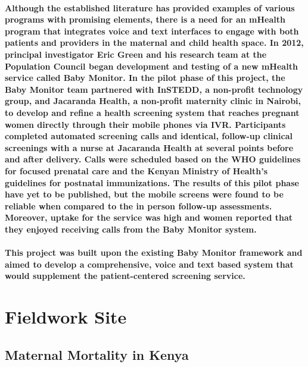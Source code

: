 

\paragraph{Although the established literature has provided examples of various programs with promising elements, there is a need for an mHealth program that integrates voice and text interfaces to engage with both patients and providers in the maternal and child health space. In 2012, principal investigator Eric Green and his research team at the Population Council began development and testing of a new mHealth service called Baby Monitor. In the pilot phase of this project, the Baby Monitor team partnered with InSTEDD, a non-profit technology group, and Jacaranda Health, a non-profit maternity clinic in Nairobi, to develop and refine a health screening system that reaches pregnant women directly through their mobile phones via IVR. Participants completed automated screening calls and identical, follow-up clinical screenings with a nurse at Jacaranda Health at several points before and after delivery. Calls were scheduled based on the WHO guidelines for focused prenatal care and the Kenyan Ministry of Health's guidelines for postnatal immunizations. The results of this pilot phase have yet to be published, but the mobile screens were found to be reliable when compared to the in person follow-up assessments. Moreover, uptake for the service was high and women reported that they enjoyed receiving calls from the Baby Monitor system.}

\paragraph{This project was built upon the existing Baby Monitor framework and aimed to develop a comprehensive, voice and text based system that would supplement the patient-centered screening service.}


\section{Fieldwork Site}
\subsection{Maternal Mortality in Kenya}
